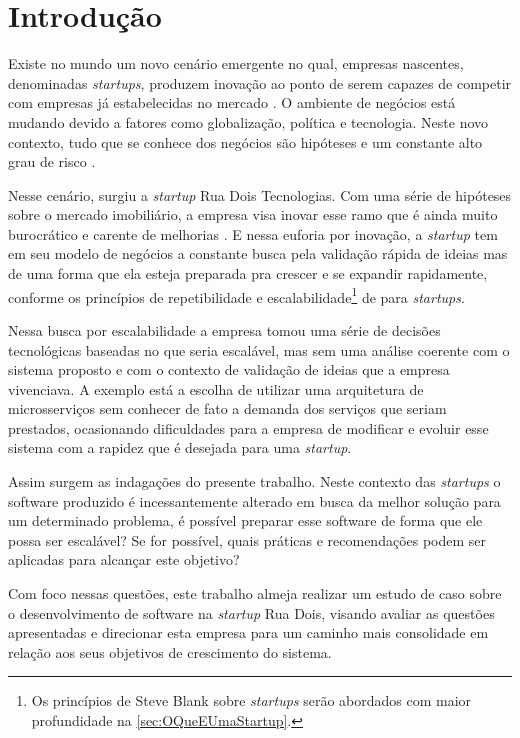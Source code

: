 \chapter[Introdução]{Introdução}

Existe no mundo um novo cenário emergente no qual, empresas nascentes,
denominadas \textit{startups}, produzem inovação ao ponto de serem capazes
de competir com empresas já estabelecidas no mercado \cite{CapacidadeDeInovacao}.
O ambiente de negócios está mudando devido a fatores como globalização, política
e tecnologia. Neste novo contexto, tudo que se conhece dos negócios são
hipóteses e um constante alto grau de risco \cite{Akiyoshi}.

Nesse cenário, surgiu a \textit{startup} Rua Dois Tecnologias. Com uma série
de hipóteses sobre o mercado imobiliário, a empresa visa inovar esse ramo que
é ainda muito burocrático e carente de melhorias \cite{LouisaXu}. E nessa
euforia por inovação, a \textit{startup} tem em seu modelo de negócios a
constante busca pela validação rápida de ideias mas de uma forma que ela
esteja preparada pra crescer e se expandir rapidamente, conforme os princípios
de repetibilidade e escalabilidade\footnote{Os princípios de Steve Blank sobre
\textit{startups} serão abordados com maior profundidade na 
\autoref{sec:OQueEUmaStartup}.} de  para
\textit{startups}.

Nessa busca por escalabilidade a empresa tomou uma série de decisões tecnológicas
baseadas no que seria escalável, mas sem uma análise coerente com o sistema
proposto e com o contexto de validação de ideias que a empresa vivenciava.
A exemplo está a escolha de utilizar uma arquitetura de microsserviços sem conhecer
de fato a demanda dos serviços que seriam prestados, ocasionando dificuldades para
a empresa de modificar e evoluir esse sistema com a rapidez que é desejada para uma
\textit{startup}.

Assim surgem as indagações do presente trabalho. Neste contexto das \textit{startups}
o software produzido é incessantemente alterado em busca da melhor solução para um
determinado problema, é possível preparar esse software de forma que ele possa ser
escalável? Se for possível, quais práticas e recomendações podem ser aplicadas para
alcançar este objetivo?

Com foco nessas questões, este trabalho almeja realizar um estudo de caso sobre o
desenvolvimento de software na \textit{startup} Rua Dois, visando avaliar as questões
apresentadas e direcionar esta empresa para um caminho mais consolidade em relação
aos seus objetivos de crescimento do sistema.

